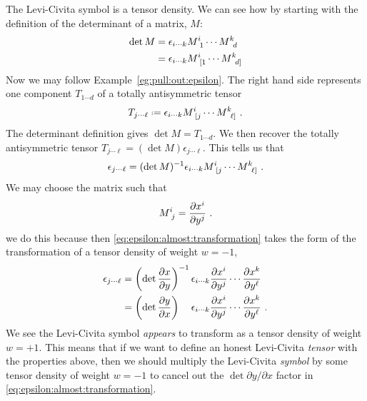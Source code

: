 \documentclass[12pt, oneside]{report}    %
\begin{document}
\begin{subappendices}
The Levi-Civita symbol is a tensor density. We can see how by starting with the definition of the determinant of a matrix, $M$:
\begin{align}
    \det M &=\epsilon_{i\cdots k} M\aij{i}{1}\cdots M\aij{k}{d}
    \\
    & =\epsilon_{i\cdots k} M\aij{i}{[1}\cdots M\aij{k}{d]}
\end{align}
Now we may follow Example~\ref{eg:pull:out:epsilon}. The right hand side represents one component $T_{1\cdots d}$ of a totally antisymmetric tensor
\begin{align}
    T_{j\cdots \ell}
    \defeq
    \epsilon_{i\cdots k} M\aij{i}{[j}\cdots M\aij{k}{\ell]} \ .
\end{align}
The determinant definition gives $\det M = T_{1\cdots d}$. We then recover the totally antisymmetric tensor $T_{j\cdots \ell} = (\det M) \epsilon_{j\cdots \ell}$. This tells us that 
\begin{align}
    \epsilon_{j\cdots \ell} = (\det M)\inv 
    \epsilon_{i\cdots k} M\aij{i}{[j}\cdots M\aij{k}{\ell]} \ .
    \label{eq:epsilon:almost:transformation}
\end{align}
We may choose the matrix such that
\begin{align}
    M\aij{i}{j} = \frac{\partial x^i}{\partial y^j} \ .
\end{align}
we do this because then \eqref{eq:epsilon:almost:transformation} takes the form of the transformation of a tensor density of weight $w=-1$,
\begin{align}
    \epsilon_{j\cdots \ell} &= 
    \left(\det \frac{\partial x}{\partial y}\right)\inv 
    \epsilon_{i\cdots k} \frac{\partial x^i}{\partial y^j} \cdots \frac{\partial x^k}{\partial y^\ell} 
    \\
    &= \left(\det \frac{\partial y}{\partial x}\right)\phantom{\inv}
    \epsilon_{i\cdots k} \frac{\partial x^i}{\partial y^j} \cdots \frac{\partial x^k}{\partial y^\ell} 
    \ .
    \label{eq:epsilon:almost:transformation:dx:dy}
\end{align}
We see the Levi-Civita symbol \emph{appears} to transform as a tensor density of weight $w=+1$. This means that if we want to define an honest Levi-Civita \emph{tensor} with the properties above, then we should multiply the Levi-Civita \emph{symbol} by some tensor density of weight $w=-1$ to cancel out the $\det \partial y/\partial x$ factor in \eqref{eq:epsilon:almost:transformation}.


\end{subappendices}
\end{document}
